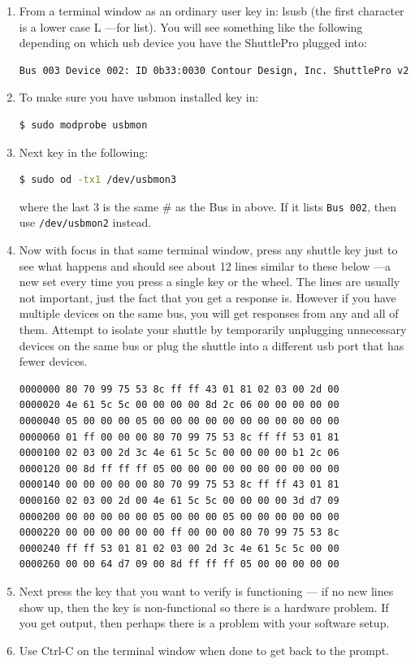 \begin{enumerate}
    \item From a terminal window as an ordinary user key in:  lsusb  (the first character is a lower case L ---for
    list).  You will see something like the following depending on which usb device you have the
    ShuttlePro plugged into:
\begin{lstlisting}[language=Bash,numbers=none]
Bus 003 Device 002: ID 0b33:0030 Contour Design, Inc. ShuttlePro v2
\end{lstlisting}
    \item To make sure you have usbmon installed key in:
\begin{lstlisting}[language=Bash,numbers=none]
$ sudo modprobe usbmon
\end{lstlisting}
    \item Next key in the following:
\begin{lstlisting}[language=Bash,numbers=none]
$ sudo od -tx1 /dev/usbmon3
\end{lstlisting}
    where the last 3 is the same \# as the Bus in above.  If it lists \texttt{Bus 002}, then use \texttt{/dev/usbmon2} instead.
    \item Now with focus in that same terminal window, press any shuttle key just to see what happens and
    should see about 12 lines similar to these below ---a new set every time you press a single key or the
    wheel.  The lines are usually not important, just the fact that you get a response is.  However if you
    have multiple devices on the same bus, you will get responses from any and all of them.  Attempt to
    isolate your shuttle by temporarily unplugging unnecessary devices on the same bus or plug the 
    shuttle into a different usb port that has fewer devices.
    \begin{lstlisting}[language=Bash,numbers=none]
0000000 80 70 99 75 53 8c ff ff 43 01 81 02 03 00 2d 00 
0000020 4e 61 5c 5c 00 00 00 00 8d 2c 06 00 00 00 00 00 
0000040 05 00 00 00 05 00 00 00 00 00 00 00 00 00 00 00 
0000060 01 ff 00 00 00 80 70 99 75 53 8c ff ff 53 01 81 
0000100 02 03 00 2d 3c 4e 61 5c 5c 00 00 00 00 b1 2c 06 
0000120 00 8d ff ff ff 05 00 00 00 00 00 00 00 00 00 00 
0000140 00 00 00 00 00 80 70 99 75 53 8c ff ff 43 01 81 
0000160 02 03 00 2d 00 4e 61 5c 5c 00 00 00 00 3d d7 09 
0000200 00 00 00 00 00 05 00 00 00 05 00 00 00 00 00 00 
0000220 00 00 00 00 00 00 ff 00 00 00 80 70 99 75 53 8c 
0000240 ff ff 53 01 81 02 03 00 2d 3c 4e 61 5c 5c 00 00 
0000260 00 00 64 d7 09 00 8d ff ff ff 05 00 00 00 00 00
    \end{lstlisting}
    \item Next press the key that you want to verify is functioning --- if no new lines show up, then the key is
    non-functional so there is a hardware problem.  If you get output, then perhaps there is a problem
    with your software setup.
    \item Use Ctrl-C on the terminal window when done to get back to the prompt.
\end{enumerate}
